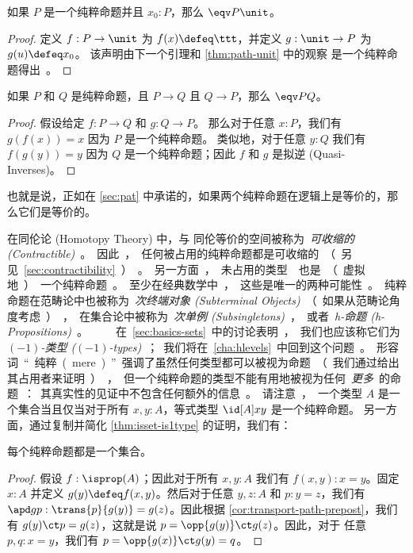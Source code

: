 \begin{lem}\label{thm:inhabprop-eqvunit}
如果 $P$ 是一个纯粹命题并且 $x_0:P$，那么 $\eqv P \unit$。
\end{lem}
\begin{proof}
  定义 $f:P\to\unit$ 为 $f(x)\defeq \ttt$，并定义 $g:\unit\to P$ 为 $g(u)\defeq x_0$。
  该声明由下一个引理和 \cref{thm:path-unit} 中的观察 \unit 是一个纯粹命题得出。
\end{proof}

\begin{lem}\label{lem:equiv-iff-hprop}
如果 $P$ 和 $Q$ 是纯粹命题，且 $P\to Q$ 且 $Q\to P$，那么 $\eqv P Q$。
\end{lem}
\begin{proof}
  假设给定 $f:P\to Q$ 和 $g:Q\to P$。
  那么对于任意 $x:P$，我们有 $g(f(x))=x$ 因为 $P$ 是一个纯粹命题。
  类似地，对于任意 $y:Q$ 我们有 $f(g(y))=y$ 因为 $Q$ 是一个纯粹命题；因此 $f$ 和 $g$ 是拟逆 (Quasi-Inverses)。
\end{proof}

也就是说，正如在 \cref{sec:pat} 中承诺的，如果两个纯粹命题在逻辑上是等价的，那么它们是等价的。

在同伦论 (Homotopy Theory) 中，与 \unit 同伦等价的空间被称为 \emph{可收缩的 (Contractible)}。
因此，任何被占用的纯粹命题都是可收缩的（另见 \cref{sec:contractibility}）。
另一方面，未占用的类型 \emptyt 也是（虚拟地）一个纯粹命题。
至少在经典数学中，这些是唯一的两种可能性。

纯粹命题在范畴论中也被称为 \emph{次终端对象 (Subterminal Objects)}（如果从范畴论角度考虑），在集合论中被称为 \emph{次单例 (Subsingletons)}，或者 \emph{h-命题 (h-Propositions)}。
%
%
%
在 \cref{sec:basics-sets} 中的讨论表明，我们也应该称它们为 \emph{$(-1)$-类型 ($(-1)$-types)}；我们将在 \cref{cha:hlevels} 中回到这个问题。
形容词“纯粹 (mere)”强调了虽然任何类型都可以被视为命题（我们通过给出其占用者来证明），但一个纯粹命题的类型不能有用地被视为任何 \emph{更多} 的命题：其真实性的见证中不包含任何额外的信息。

请注意，一个类型 $A$ 是一个集合当且仅当对于所有 $x,y:A$，等式类型 $\id[A]xy$ 是一个纯粹命题。
另一方面，通过复制并简化 \cref{thm:isset-is1type} 的证明，我们有：

\begin{lem}\label{thm:prop-set}
每个纯粹命题都是一个集合。
\end{lem}
\begin{proof}
  假设 $f:\isprop(A)$；因此对于所有 $x,y:A$ 我们有 $f(x,y):x=y$。固定 $x:A$
  并定义 $g(y)\defeq f(x,y)$。然后对于任意 $y,z:A$ 和 $p:y=z$，我们有 $\apd
  g p : \trans{p}{g(y)}={g(z)}$。因此根据 \cref{cor:transport-path-prepost}，我们有
  $g(y)\ct p = g(z)$，这就是说 $p=\opp{g(y)}\ct g(z)$。因此，对于
  任意 $p,q:x=y$，我们有 $p = \opp{g(x)}\ct g(y) = q$。
\end{proof}

